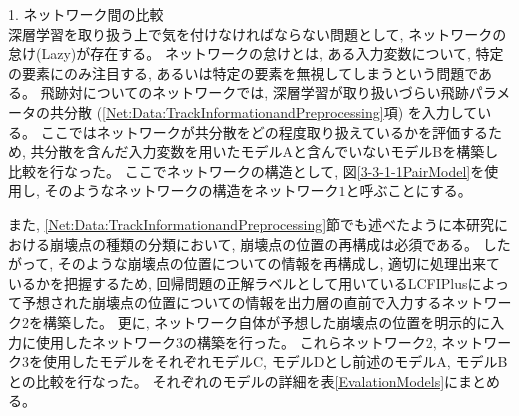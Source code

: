 1. ネットワーク間の比較\\

深層学習を取り扱う上で気を付けなければならない問題として, ネットワークの怠け(Lazy)が存在する。
ネットワークの怠けとは, ある入力変数について, 特定の要素にのみ注目する, あるいは特定の要素を無視してしまうという問題である。
飛跡対についてのネットワークでは, 深層学習が取り扱いづらい飛跡パラメータの共分散 (\ref{Net:Data:TrackInformationandPreprocessing}項) を入力している。
ここではネットワークが共分散をどの程度取り扱えているかを評価するため, 共分散を含んだ入力変数を用いたモデルAと含んでいないモデルBを構築し比較を行なった。
ここでネットワークの構造として, 図\ref{3-3-1-1PairModel}を使用し, そのようなネットワークの構造をネットワーク$1$と呼ぶことにする。

また, \ref{Net:Data:TrackInformationandPreprocessing}節でも述べたように本研究における崩壊点の種類の分類において, 崩壊点の位置の再構成は必須である。
したがって, そのような崩壊点の位置についての情報を再構成し, 適切に処理出来ているかを把握するため, 回帰問題の正解ラベルとして用いているLCFIPlusによって予想された崩壊点の位置についての情報を出力層の直前で入力するネットワーク2を構築した。
更に, ネットワーク自体が予想した崩壊点の位置を明示的に入力に使用したネットワーク3の構築を行った。
これらネットワーク2, ネットワーク3を使用したモデルをそれぞれモデルC, モデルDとし前述のモデルA, モデルBとの比較を行なった。
それぞれのモデルの詳細を表\ref{EvalationModels}にまとめる。

